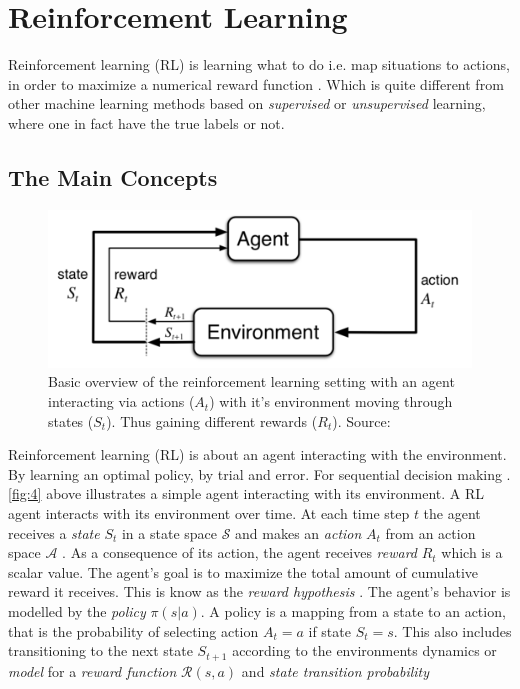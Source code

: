 \documentclass{kththesis}
\theoremstyle{definition}
\begin{document}
\section{Reinforcement Learning}
Reinforcement learning (RL) is learning what to do i.e. map situations to actions, in order to maximize a numerical reward function \parencite{sutton1998reinforcement}. Which is quite different from other machine learning methods based on \textit{supervised} or \textit{unsupervised} learning, where one in fact have the true labels or not.
\subsection{The Main Concepts}
\begin{figure}[H]
    \centering
    \includegraphics[scale=1]{basicRL.png}
    \caption{Basic overview of the reinforcement learning setting with an agent interacting via actions ($A_t$) with it's environment moving through states ($S_t$). Thus gaining different rewards ($R_t$). Source: \textcite{sutton1998reinforcement} }
    \label{fig:4}
\end{figure}

Reinforcement learning (RL) is about an agent interacting with the environment. By learning an optimal policy, by trial and error. For sequential decision making \parencite{li2017deep}. \autoref{fig:4} above illustrates a simple agent interacting with its environment. A RL agent interacts with its environment over time. At each time step $t$ the agent receives  a \textit{state} $S_t$ in a state space $\mathcal{S}$ and makes an \textit{action} $A_t$ from an action space $\mathcal{A}$ \parencite{li2017deep}. As a consequence of its action, the agent receives \textit{reward} $R_t$ which is a scalar value. The agent's goal is to maximize the total amount of cumulative reward it receives. This is know as the \textit{reward hypothesis} \parencite{sutton1998reinforcement}. The agent's behavior is modelled by the \textit{policy} $\pi(s|a)$. A policy is a mapping from a state to an action, that is the probability of selecting action $A_t=a$ if state $S_t = s$. 
\newline
\newline
This also includes transitioning to the next state $S_{t+1}$ according to the environments dynamics or \textit{model} for a \textit{reward function} $\mathcal{R}(s,a)$ and \textit{state transition probability}
\end{document}
